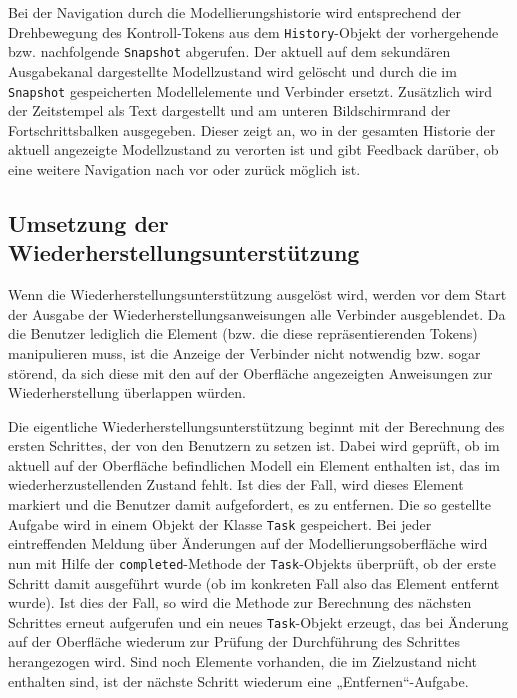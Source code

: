 Bei der Navigation durch die Modellierungshistorie wird entsprechend der Drehbewegung des Kontroll-Tokens aus dem \texttt{History}-Objekt der vorhergehende bzw. nachfolgende \texttt{Snapshot} abgerufen. Der aktuell auf dem sekundären Ausgabekanal dargestellte Modellzustand wird gelöscht und durch die im \texttt{Snapshot} gespeicherten Modellelemente und Verbinder ersetzt. Zusätzlich wird der Zeitstempel als Text dargestellt und am unteren Bildschirmrand der Fortschrittsbalken ausgegeben. Dieser zeigt an, wo in der gesamten Historie der aktuell angezeigte Modellzustand zu verorten ist und gibt Feedback darüber, ob eine weitere Navigation nach vor oder zurück möglich ist.


\subsection{Umsetzung der Wiederherstellungsunterstützung} %
\label{sub:umsetzung_der_wiederherstellungsunterstützung}

Wenn die Wiederherstellungsunterstützung ausgelöst wird, werden vor dem Start der Ausgabe der Wiederherstellungsanweisungen alle Verbinder ausgeblendet. Da die Benutzer lediglich die Element (bzw. die diese repräsentierenden Tokens) manipulieren muss, ist die Anzeige der Verbinder nicht notwendig bzw. sogar störend, da sich diese mit den auf der Oberfläche angezeigten Anweisungen zur Wiederherstellung überlappen würden. 

Die eigentliche Wiederherstellungsunterstützung beginnt mit der Berechnung des ersten Schrittes, der von den Benutzern zu setzen ist. Dabei wird geprüft, ob im aktuell auf der Oberfläche befindlichen Modell ein Element enthalten ist, das im wiederherzustellenden Zustand fehlt. Ist dies der Fall, wird dieses Element markiert und die Benutzer damit aufgefordert, es zu entfernen. Die so gestellte Aufgabe wird in einem Objekt der Klasse \texttt{Task} gespeichert. Bei jeder eintreffenden Meldung über Änderungen auf der Modellierungsoberfläche wird nun mit Hilfe der \texttt{completed}-Methode der \texttt{Task}-Objekts überprüft, ob der erste Schritt damit ausgeführt wurde (ob im konkreten Fall also das Element entfernt wurde). Ist dies der Fall, so wird die Methode zur Berechnung des nächsten Schrittes erneut aufgerufen und ein neues \texttt{Task}-Objekt erzeugt, das bei Änderung auf der Oberfläche wiederum zur Prüfung der Durchführung des Schrittes herangezogen wird. Sind noch Elemente vorhanden, die im Zielzustand nicht enthalten sind, ist der nächste Schritt wiederum eine „Entfernen“-Aufgabe. 

